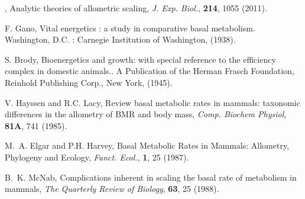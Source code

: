 \begin{thebibliography}{100}








, {Analytic theories of allometric scaling}, \textit{J. Exp. Biol.}, \textbf{214}, 1055 {(2011)}.

 {F. Gano}, {Vital energetics : a study in comparative basal metabolism}. {Washington, D.C. : Carnegie Institution of Washington}, {(1938)}.

 S. Brody, {Bioenergetics and growth: with special reference to the efficiency complex in domestic animals.}. A Publication of the Herman Frasch Foundation, Reinhold Publishing Corp., New York, (1945).

 V. Hayssen and R.C. Lacy, {Review basal metabolic rates in mammals:  taxonomic differences in the allometry of BMR and body mass}, \textit{Comp. Biochem Physiol}, \textbf{81A},  741 (1985).

 M.~A. Elgar and P.H. Harvey, {Basal Metabolic Rates in Mammals: Allometry, Phylogeny and Ecology}, \textit{Funct. Ecol.}, \textbf{1}, 25 (1987).

 B.~K. McNab, {Complications inherent in scaling the basal rate of metabolism in mammals}, \textit{The Quarterly Review of Biology}, \textbf{63}, 25 (1988).


\end{thebibliography}
